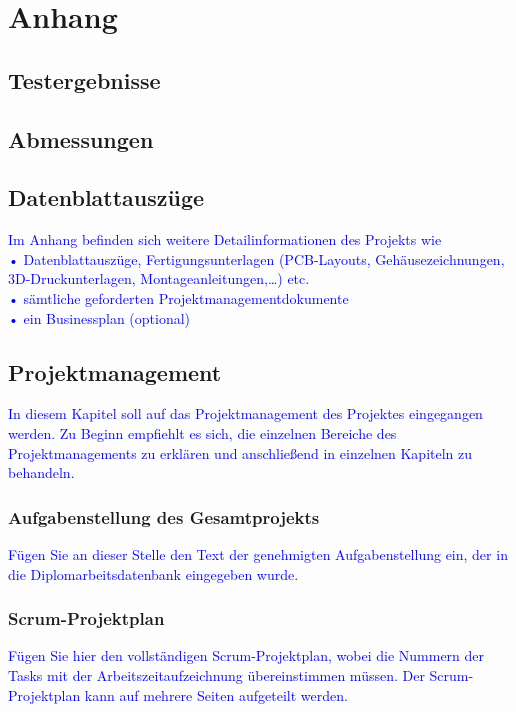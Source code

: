 \section{Anhang}
\subsection{Testergebnisse}

\subsection{Abmessungen}

\subsection{Datenblattauszüge}

\textcolor{blue}{Im Anhang befinden sich weitere Detailinformationen des Projekts wie\\
•	Datenblattauszüge, Fertigungsunterlagen (PCB-Layouts, Gehäusezeichnungen, 3D-Druckunterlagen, Montageanleitungen,…) etc.\\
•	sämtliche geforderten Projektmanagementdokumente\\
•	ein Businessplan (optional)
}

\subsection{Projektmanagement}
\textcolor{blue}{In diesem Kapitel soll auf das Projektmanagement des Projektes eingegangen werden. Zu Beginn empfiehlt es sich, die einzelnen Bereiche des Projektmanagements zu erklären und anschließend in einzelnen Kapiteln zu behandeln.}

\subsubsection{Aufgabenstellung des Gesamtprojekts}
\textcolor{blue}{Fügen Sie an dieser Stelle den Text der genehmigten Aufgabenstellung ein, der in die Diplomarbeitsdatenbank  eingegeben wurde.}

\subsubsection{Scrum-Projektplan}
\textcolor{blue}{Fügen Sie hier den vollständigen Scrum-Projektplan, wobei die Nummern der Tasks mit der Arbeitszeitaufzeichnung übereinstimmen müssen. Der Scrum-Projektplan kann auf mehrere Seiten aufgeteilt werden.}

